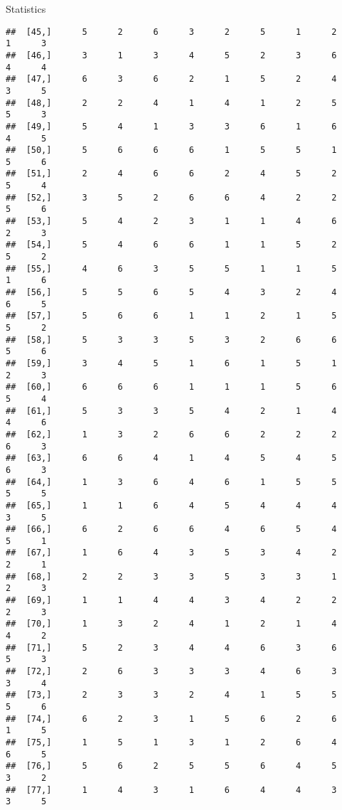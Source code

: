 \documentclass[
  ignorenonframetext,
]{beamer}
\begin{document}
\begin{frame}[fragile]{Statistics}
\begin{verbatim}
##  [45,]      5      2      6      3      2      5      1      2      1      3
##  [46,]      3      1      3      4      5      2      3      6      4      4
##  [47,]      6      3      6      2      1      5      2      4      3      5
##  [48,]      2      2      4      1      4      1      2      5      5      3
##  [49,]      5      4      1      3      3      6      1      6      4      5
##  [50,]      5      6      6      6      1      5      5      1      5      6
##  [51,]      2      4      6      6      2      4      5      2      5      4
##  [52,]      3      5      2      6      6      4      2      2      5      6
##  [53,]      5      4      2      3      1      1      4      6      2      3
##  [54,]      5      4      6      6      1      1      5      2      5      2
##  [55,]      4      6      3      5      5      1      1      5      1      6
##  [56,]      5      5      6      5      4      3      2      4      6      5
##  [57,]      5      6      6      1      1      2      1      5      5      2
##  [58,]      5      3      3      5      3      2      6      6      5      6
##  [59,]      3      4      5      1      6      1      5      1      2      3
##  [60,]      6      6      6      1      1      1      5      6      5      4
##  [61,]      5      3      3      5      4      2      1      4      4      6
##  [62,]      1      3      2      6      6      2      2      2      6      3
##  [63,]      6      6      4      1      4      5      4      5      6      3
##  [64,]      1      3      6      4      6      1      5      5      5      5
##  [65,]      1      1      6      4      5      4      4      4      3      5
##  [66,]      6      2      6      6      4      6      5      4      5      1
##  [67,]      1      6      4      3      5      3      4      2      2      1
##  [68,]      2      2      3      3      5      3      3      1      2      3
##  [69,]      1      1      4      4      3      4      2      2      2      3
##  [70,]      1      3      2      4      1      2      1      4      4      2
##  [71,]      5      2      3      4      4      6      3      6      5      3
##  [72,]      2      6      3      3      3      4      6      3      3      4
##  [73,]      2      3      3      2      4      1      5      5      5      6
##  [74,]      6      2      3      1      5      6      2      6      1      5
##  [75,]      1      5      1      3      1      2      6      4      6      5
##  [76,]      5      6      2      5      5      6      4      5      3      2
##  [77,]      1      4      3      1      6      4      4      3      3      5

\end{verbatim}
\end{frame}
\end{document}
